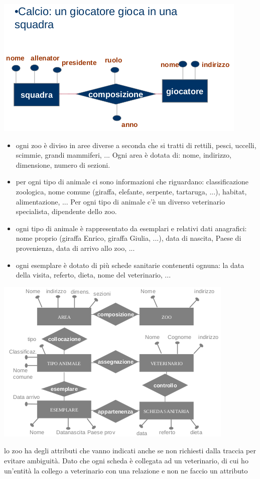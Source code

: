 \documentclass[a4paper,12pt, oneside]{book}
\begin{document}
\begin{center}
	\includegraphics[scale=1]{img/er2.png}
\end{center}
\begin{esempio}
	\begin{itemize}
		\item ogni zoo è diviso in aree diverse a seconda che si tratti di rettili, pesci, uccelli, scimmie, grandi mammiferi, ... Ogni area è dotata di: nome,
		      indirizzo, dimensione, numero di sezioni.
		\item per ogni tipo di animale ci sono informazioni che riguardano: classificazione zoologica, nome comune (giraffa, elefante, serpente,
		      tartaruga, ...), habitat, alimentazione, ... Per ogni tipo di animale c'è un diverso veterinario specialista, dipendente dello zoo.
		\item ogni tipo di animale è rappresentato da esemplari e relativi dati anagrafici: nome proprio (giraffa Enrico, giraffa Giulia, ...), data di nascita,
		      Paese di provenienza, data di arrivo allo zoo, ...
		\item ogni esemplare è dotato di più schede sanitarie contenenti ognuna: la data della visita, referto, dieta, nome del veterinario, ...

	\end{itemize}
	\begin{center}
		\includegraphics[scale=0.8]{img/er3.png}
	\end{center}
	lo zoo ha degli attributi che vanno indicati anche se non richiesti dalla traccia per evitare ambiguità. Dato che ogni scheda è collegata ad un veterinario, di cui ho un'entità la collego a veterinario con una relazione e non ne faccio  un attributo
\end{esempio}
\end{document}
